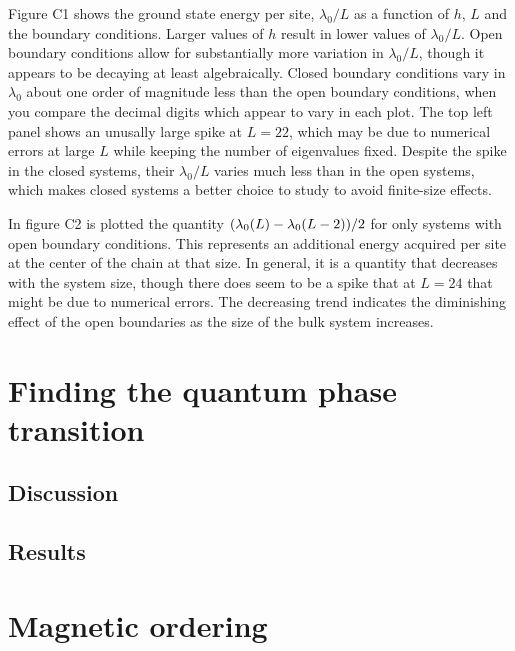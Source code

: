 \documentclass{article}
\begin{document}
{\centering



}

Figure C1 shows the ground state energy per site, $\lambda_0 / L$
as a function of $h$, $L$ and the boundary conditions.
Larger values of $h$ result in lower values of $\lambda_0 / L$.
Open boundary conditions allow for substantially more variation
in $\lambda_0 / L$, though it appears to be decaying at least
algebraically.
Closed boundary conditions vary in $\lambda_0$ about one order
of magnitude less than the open boundary conditions, when you
compare the decimal digits which appear to vary in each plot.
The top left panel shows an unusally large spike at $L=22$,
which may be due to numerical errors at large $L$ while keeping
the number of eigenvalues fixed.
Despite the spike in the closed systems, their $\lambda_0 / L$
varies much less than in the open systems, which makes closed
systems a better choice to study to avoid finite-size effects.

In figure C2 is plotted the quantity $\qty( \lambda_0(L) - \lambda_0(L-2)) / 2$
for only systems with open boundary conditions.
This represents an additional energy acquired per site at the center of the chain
at that size.
In general, it is a quantity that decreases with the system size, though
there does seem to be a spike that at $L=24$ that might be due to numerical
errors.
The decreasing trend indicates the diminishing effect of the open boundaries
as the size of the bulk system increases.

{\centering



}

\newpage

\section{
Finding the quantum phase transition
}


\subsection{
Discussion
}

\subsection{
Results
}


\newpage

\section{
Magnetic ordering
}
\end{document}
